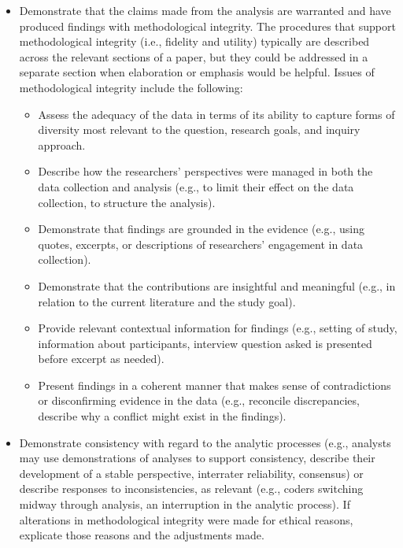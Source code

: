 \documentclass[acmsmall]{acmart}
\begin{document}
\begin{itemize}
    \item Demonstrate that the claims made from the analysis are warranted and have produced findings with methodological integrity. The procedures that support methodological integrity (i.e., fidelity and utility) typically are described across the relevant sections of a paper, but they could be addressed in a separate section when elaboration or emphasis would be helpful. Issues of methodological integrity include the following:
    \begin{itemize}
        \item Assess the adequacy of the data in terms of its ability to capture forms of diversity most relevant to the question, research goals, and inquiry approach.
        \item Describe how the researchers’ perspectives were managed in both the data collection
        and analysis (e.g., to limit their effect on the data collection, to structure the analysis).
        \item Demonstrate that findings are grounded in the evidence (e.g., using quotes, excerpts, or
        descriptions of researchers’ engagement in data collection).
        \item Demonstrate that the contributions are insightful and meaningful (e.g., in relation to the
        current literature and the study goal).
        \item Provide relevant contextual information for findings (e.g., setting of study, information
        about participants, interview question asked is presented before excerpt as needed).
        \item Present findings in a coherent manner that makes sense of contradictions or disconfirming evidence in the data (e.g., reconcile discrepancies, describe why a conflict might exist in the findings).
    \end{itemize}

    \item Demonstrate consistency with regard to the analytic processes (e.g., analysts may use demonstrations of analyses to support consistency, describe their development of a stable perspective, interrater reliability, consensus) or describe responses to inconsistencies, as relevant (e.g., coders switching midway through analysis, an interruption in the analytic
    process). If alterations in methodological integrity were made for ethical reasons, explicate those reasons and the adjustments made.


\end{itemize}
\end{document}
